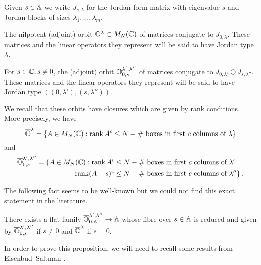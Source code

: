 \documentclass{article} %
\begin{document}
Given $ s \in \AA$ we write $ J_{s,\lambda}$ for the Jordan form matrix with eigenvalue $ s$ and Jordan blocks of sizes $ \lambda_1, \dots, \lambda_m$.
    
\begin{definition}
\label{def:Olam}
The nilpotent (adjoint) orbit $ \OO^\lambda \subset M_N(\CC)$ of matrices conjugate to $ J_{0,\lambda}$. These matrices and the linear operators they represent will be said to have Jordan type $\lambda$.
\end{definition}  
% 
% 
\begin{definition}
\label{def:Olamlam}
    For $ s \in \CC, s \ne 0$, the (adjoint) orbit $ \OO^{\lambda', \lambda''}_{0,s}$ of matrices conjugate to $ J_{0,\lambda'} \oplus J_{s,\lambda''}$.
    These matrices and the linear operators they represent will be said to have Jordan type $((0,\lambda'), (s,\lambda''))$.
\end{definition}  
% 

% 

     
We recall that these orbits have closures which are given by rank conditions.  
More precisely, we have
$$
    \overline{\OO}^\lambda = \{ A \in M_N(\CC) : \rk A^c \le N - \#\text{~boxes in first $c$ columns of }\lambda \}
$$
and
\begin{equation} 
\label{eq:ranks}
\begin{split}
    \overline{\OO}^{\lambda', \lambda''}_{0,s} = \{ A \in M_N(\CC) : \rk A^i &\le N - 
    \#\text{~boxes in first $c$ columns of }\lambda' \\
    \rk (A-s)^c &\le N - \#\text{~boxes in first $c$ columns of }\lambda'' \}\,. 
\end{split}
\end{equation}
%  

The following fact seems to be well-known but we could not find this exact statement in the literature.
\begin{proposition} 
    \label{prop:adjoint}
    There exists a flat family $\overline{\OO}^{\lambda', \lambda''}_{0,\AA} \rightarrow \AA$ whose fibre over $s \in \AA$ is reduced and given by $\overline{\OO}^{\lambda', \lambda''}_{0,s}$ if $s \ne 0 $ and $\overline{\OO}^\lambda $ if $ s = 0$.
\end{proposition}
% 
In order to prove this proposition, we will need to recall some results from Eisenbud--Saltman \cite{eisenbud1989rank}. 
% 
\end{document}
